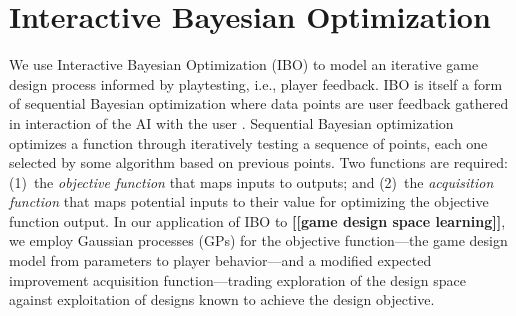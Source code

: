 \documentclass{sig-alternate}
\newcommand{\mytodo}[1]{\textbf{[[#1]]}}
\begin{document}
\section{Interactive Bayesian Optimization} %


We use Interactive Bayesian Optimization (IBO) to model an iterative game design process informed by playtesting, i.e., player feedback. 
IBO is itself a form of sequential Bayesian optimization where data points are user feedback gathered in interaction of the AI with the user \cite{brochu2010:thesis}.
Sequential Bayesian optimization optimizes a function through iteratively testing a sequence of points, each one selected by some algorithm based on previous points. 
Two functions are required: (1)~the \textit{objective function} that maps inputs to outputs; and (2)~the \textit{acquisition function} that maps potential inputs to their value for optimizing the objective function output. 
%
In our application of IBO to \mytodo{game design space learning}, we employ Gaussian processes (GPs) for the objective function---the game design model from parameters to player behavior---and a modified expected improvement acquisition function---trading exploration of the design space against exploitation of designs known to achieve the design objective.
\end{document}
